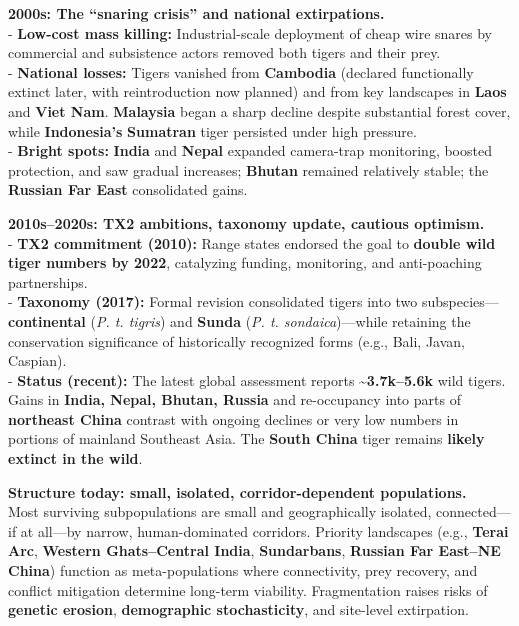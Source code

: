 \documentclass[
]{article}
\begin{document}
\textbf{2000s: The ``snaring crisis'' and national extirpations.}\\
- \textbf{Low-cost mass killing:} Industrial-scale deployment of cheap
wire snares by commercial and subsistence actors removed both tigers and
their prey.\\
- \textbf{National losses:} Tigers vanished from \textbf{Cambodia}
(declared functionally extinct later, with reintroduction now planned)
and from key landscapes in \textbf{Laos} and \textbf{Viet Nam}.
\textbf{Malaysia} began a sharp decline despite substantial forest
cover, while \textbf{Indonesia's} \textbf{Sumatran} tiger persisted
under high pressure.\\
- \textbf{Bright spots:} \textbf{India} and \textbf{Nepal} expanded
camera-trap monitoring, boosted protection, and saw gradual increases;
\textbf{Bhutan} remained relatively stable; the \textbf{Russian Far
East} consolidated gains.

\textbf{2010s--2020s: TX2 ambitions, taxonomy update, cautious
optimism.}\\
- \textbf{TX2 commitment (2010):} Range states endorsed the goal to
\textbf{double wild tiger numbers by 2022}, catalyzing funding,
monitoring, and anti-poaching partnerships.\\
- \textbf{Taxonomy (2017):} Formal revision consolidated tigers into two
subspecies---\textbf{continental} (\emph{P. t. tigris}) and
\textbf{Sunda} (\emph{P. t. sondaica})---while retaining the
conservation significance of historically recognized forms (e.g., Bali,
Javan, Caspian).\\
- \textbf{Status (recent):} The latest global assessment reports
\textbf{\textasciitilde3.7k--5.6k} wild tigers. Gains in \textbf{India,
Nepal, Bhutan, Russia} and re-occupancy into parts of \textbf{northeast
China} contrast with ongoing declines or very low numbers in portions of
mainland Southeast Asia. The \textbf{South China} tiger remains
\textbf{likely extinct in the wild}.

\textbf{Structure today: small, isolated, corridor-dependent
populations.}\\
Most surviving subpopulations are small and geographically isolated,
connected---if at all---by narrow, human-dominated corridors. Priority
landscapes (e.g., \textbf{Terai Arc}, \textbf{Western Ghats--Central
India}, \textbf{Sundarbans}, \textbf{Russian Far East--NE China})
function as meta-populations where connectivity, prey recovery, and
conflict mitigation determine long-term viability. Fragmentation raises
risks of \textbf{genetic erosion}, \textbf{demographic stochasticity},
and site-level extirpation.
\end{document}
